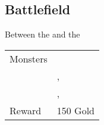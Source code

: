 \subsection{Battlefield}
\label{map:battlefield_03}

Between the  and the 

\noindent\begin{tabularx}{\textwidth}[l]{lX}
	Monsters
	& \nameref{monster:minotaur_zombie} \\
	& \nameref{monster:minotaur_zombie}, \nameref{monster:basilisk} \\
	& \nameref{monster:sand_worm}, \nameref{monster:sand_worm}
\\ \hline
	Reward & 150 Gold
\end{tabularx}
